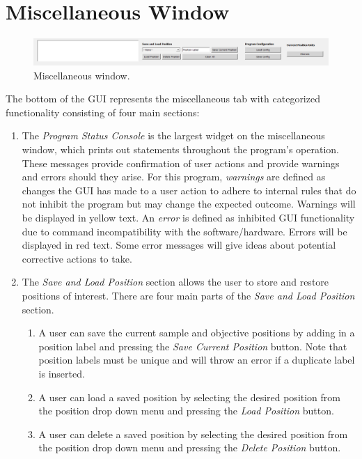 \documentclass[a4paper, 12pt]{report}
\begin{document}
    \section{Miscellaneous Window}\label{miscellaneous_window}
    \begin{figure}[h]
        \centering
        \includegraphics[width=\textwidth]{figures/miscelaneous_tab.png}
        \caption{Miscellaneous window.}
        \label{fig:10}
    \end{figure}
    
    The bottom of the GUI represents the miscellaneous tab with categorized functionality consisting of four main sections:
    \begin{enumerate}
        \item The \textit{Program Status Console} is the largest widget on the miscellaneous window, which prints out statements throughout the program's operation. These messages provide confirmation of user actions and provide warnings and errors should they arise. For this program, \textit{warnings} are defined as changes the GUI has made to a user action to adhere to internal rules that do not inhibit the program but may change the expected outcome. Warnings will be displayed in yellow text. An \textit{error} is defined as inhibited GUI functionality due to command incompatibility with the software/hardware. Errors will be displayed in red text. Some error messages will give ideas about potential corrective actions to take.
        \item The \textit{Save and Load Position} section allows the user to store and restore positions of interest. There are four main parts of the \textit{Save and Load Position} section.
        \begin{enumerate}
            \item A user can save the current sample and objective positions by adding in a position label and pressing the \textit{Save Current Position} button. Note that position labels must be unique and will throw an error if a duplicate label is inserted.
            \item A user can load a saved position by selecting the desired position from the position drop down menu and pressing the \textit{Load Position} button.
            \item A user can delete a saved position by selecting the desired position from the position drop down menu and pressing the \textit{Delete Position} button.

\end{enumerate}
\end{enumerate}
\end{document}
